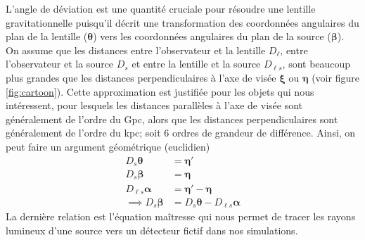 L'angle de déviation est une quantité cruciale pour résoudre une lentille gravitationnelle 
puisqu'il décrit une transformation des coordonnées angulaires du plan de la lentille ($\boldsymbol{ \theta} $) 
vers les coordonnées angulaires du plan de la source ($\boldsymbol{ \beta} $). 
On assume que les distances entre l'observateur et la lentille $D_{\ell}$, entre l'observateur et la source $D_s$ et entre la lentille et la source $D_{\ell s}$, 
sont beaucoup plus grandes que les distances perpendiculaires à l'axe de visée $\boldsymbol{ \xi} $ ou $\boldsymbol{ \eta}$ 
(voir figure \ref{fig:cartoon}). 
Cette approximation est justifiée pour les objets qui nous intéressent,
pour lesquels les distances parallèles à l'axe de visée sont généralement 
de l'ordre du Gpc, alors que les distances perpendiculaires sont généralement 
de l'ordre du kpc; soit 6 ordres de grandeur de différence.
Ainsi, on peut faire un argument géométrique (euclidien) 
\begin{align}
\nonumber
       D_{s} \boldsymbol{ \theta} &= \boldsymbol{ \eta}' \\   
\nonumber
       D_{s} \boldsymbol{ \beta} &= \boldsymbol{ \eta} \\   
\nonumber
       D_{\ell s} \boldsymbol{ \alpha} &= \boldsymbol{ \eta}' - \boldsymbol{ \eta}  \\   
\label{eq:lens equation}
       \implies D_s \boldsymbol{ \beta} &= D_s \boldsymbol{ \theta} - D_{\ell s} \boldsymbol{ \alpha}   
\end{align} 
La dernière relation est l'équation maîtresse qui nous permet de tracer les rayons lumineux d'une source 
vers un détecteur fictif dans nos simulations. 

